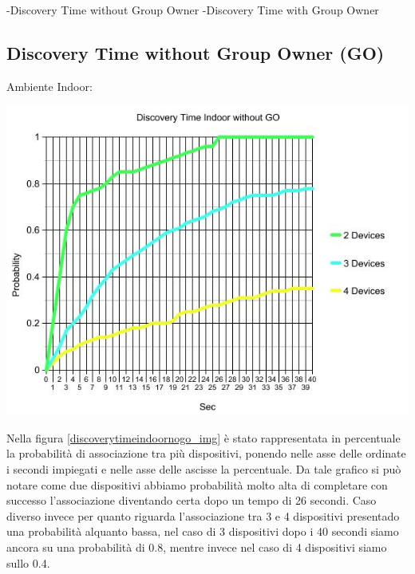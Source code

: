 -Discovery Time without Group Owner
-Discovery Time with Group Owner

\subsection{Discovery Time without Group Owner (GO)}

Ambiente Indoor:
\begin{center}
\includegraphics[width=1\textwidth]{imgs/Discovery_Time_Indoor_no_GO.jpg}
\label{discoverytimeindoornogo_img}%
\end{center}

Nella figura \ref{discoverytimeindoornogo_img} è stato rappresentata in percentuale la probabilità di associazione tra più dispositivi, ponendo nelle asse delle ordinate i secondi impiegati e nelle asse delle ascisse la percentuale.
Da tale grafico si può notare come due dispositivi abbiamo probabilità molto alta di completare con successo l'associazione diventando certa dopo un tempo di 26 secondi.
Caso diverso invece per quanto riguarda l'associazione tra 3 e 4 dispositivi presentado una probabilità alquanto bassa, nel caso di 3 dispositivi dopo i 40 secondi siamo ancora su una probabilità di 0.8, mentre invece nel caso di 4 dispositivi siamo sullo 0.4.

